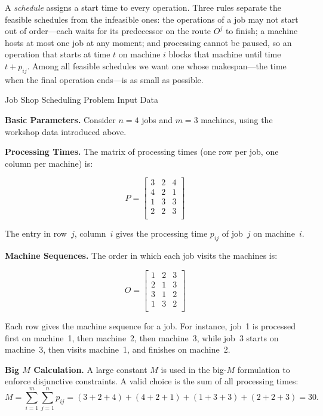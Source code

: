 A \emph{schedule} assigns a start time to every operation.
Three rules separate the feasible schedules from the infeasible ones: the operations of a job may not start out of order---each waits for its predecessor on the route $O^j$ to finish; a machine hosts at most one job at any moment; and processing cannot be paused, so an operation that starts at time $t$ on machine $i$ blocks that machine until time $t + p_{ij}$.
Among all feasible schedules we want one whose makespan---the time when the final operation ends---is as small as possible.



\begin{example}{Job Shop Scheduling Problem Input Data}{}

\textbf{Basic Parameters.}
Consider $n = 4$ jobs and $m = 3$ machines, using the workshop data introduced above.

\textbf{Processing Times.}
The matrix of processing times (one row per job, one column per machine) is:

\[
P =
\begin{bmatrix}
3 & 2 & 4 \\
4 & 2 & 1 \\
1 & 3 & 3 \\
2 & 2 & 3 \\
\end{bmatrix}
\]

The entry in row~$j$, column~$i$ gives the processing time $p_{ij}$ of job~$j$ on machine~$i$.

\textbf{Machine Sequences.}
The order in which each job visits the machines is:

\[
O =
\begin{bmatrix}
1 & 2 & 3 \\
2 & 1 & 3 \\
3 & 1 & 2 \\
1 & 3 & 2 \\
\end{bmatrix}
\]

Each row gives the machine sequence for a job.
For instance, job~1 is processed first on machine~1, then machine~2, then machine~3,
while job~3 starts on machine~3, then visits machine~1, and finishes on machine~2.

\textbf{Big \(M\) Calculation.}
A large constant $M$ is used in the big-$M$ formulation to enforce disjunctive constraints.
A valid choice is the sum of all processing times:
\[
M = \sum_{i=1}^{m} \sum_{j=1}^{n} p_{ij} = (3+2+4)+(4+2+1)+(1+3+3)+(2+2+3) = 30.
\]
\end{example}

